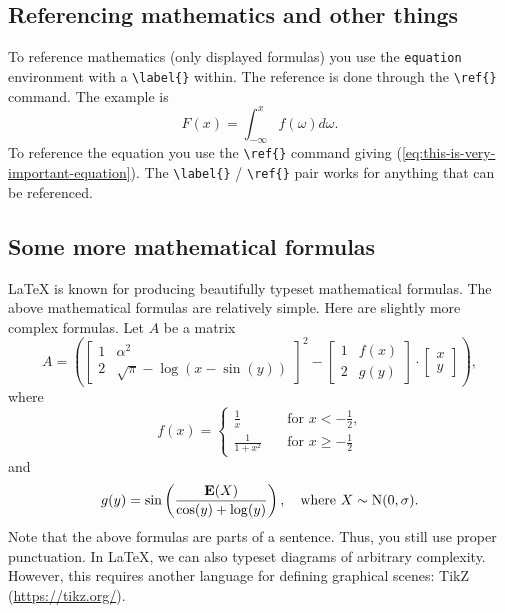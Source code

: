 \documentclass[english, twoside, 12pt, a4paper]{article}
\theoremstyle{definition}
\theoremstyle{plain}
\theoremstyle{remark}
\begin{document}
\subsection{Referencing mathematics and other things}

To reference mathematics (only displayed formulas) you use the \verb+equation+ environment with a \verb+\label{}+ within. The reference is done through the \verb+\ref{}+ command. The example is
\begin{equation}
\label{eq:this-is-very-important-equation}
F(x) = \int_{-\infty}^{x} f(\omega) d\omega.
\end{equation}
To reference the equation you use the \verb+\ref{}+ command giving (\ref{eq:this-is-very-important-equation}). The \verb+\label{}+ / \verb+\ref{}+ pair works for anything that can be referenced.

\subsection{Some more mathematical formulas}

\LaTeX{} is known for producing beautifully typeset mathematical formulas. The above mathematical formulas are relatively simple. Here are slightly more complex formulas. Let \(A\) be a matrix
\[
A =
\left(
\begin{bmatrix}
1                   & \alpha^2       \\
2                   & \sqrt{\pi} - \log(x-\sin(y))
\end{bmatrix}^{2}
- 
\begin{bmatrix}
1                   & f(x)           \\
2                   & g(y)
\end{bmatrix}
\cdot
\begin{bmatrix}
x                                    \\
y
\end{bmatrix}
\right),
\]
where
\[
f(x) = 
\left\{
  \begin{aligned}
    \frac{1}{x}     & \quad \text{for \(x<-\frac{1}{2}\),} \\
    \frac{1}{1+x^2} & \quad \text{for \(x \geq -\frac{1}{2}\)}
  \end{aligned}
\right.
\]
and
\[
g(y) = \sin\left(\frac{\mathrm{\mathbf{E}}(X)}{\cos(y) + \log(y)}\right), 
\quad\text{where \( X \sim \mathrm{N}(0, \sigma)  \).}
\]
Note that the above formulas are parts of a sentence. Thus, you still use proper punctuation. In \LaTeX{}, we can also typeset diagrams of arbitrary complexity. However, this requires another language for defining graphical scenes: TikZ (\url{https://tikz.org/}). 
\end{document}
